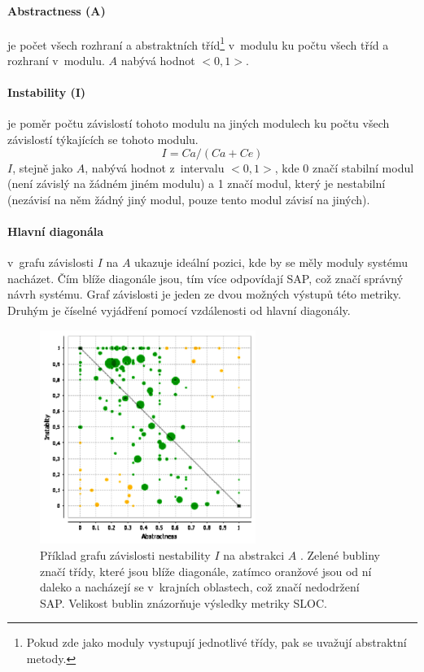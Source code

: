 \documentclass[11pt,twoside,a4paper]{book}
\begin{document}
\paragraph{Abstractness (A)} je počet všech rozhraní a abstraktních tříd\footnote{Pokud zde jako moduly vystupují jednotlivé třídy, pak
se uvažují abstraktní metody.}
v~modulu ku počtu všech tříd a rozhraní v~modulu. $A$ nabývá hodnot $<0,1>$.

\paragraph{Instability (I)} je poměr počtu závislostí tohoto modulu na jiných modulech ku počtu všech závislostí týkajících se tohoto modulu.
$$I = Ca / (Ca + Ce)$$
$I$, stejně jako $A$, nabývá hodnot z~intervalu $<0,1>$, kde 0 značí stabilní modul (není závislý na žádném jiném modulu) a 1 značí modul,
který je nestabilní (nezávisí na něm žádný jiný modul, pouze tento modul závisí na jiných).

\paragraph{Hlavní diagonála} v~grafu závislosti $I$ na $A$ ukazuje ideální pozici, kde by se měly moduly systému nacházet.
Čím blíže diagonále jsou, tím více odpovídají SAP, což značí správný návrh systému.
Graf závislosti je jeden ze dvou možných výstupů této metriky. Druhým je číselné vyjádření pomocí vzdálenosti od hlavní diagonály.

\begin{figure}[H]
\begin{center}
\includegraphics[width=7cm]{figures/martins_metrics2.pdf}
\caption{Příklad grafu závislosti nestability $I$ na abstrakci $A$ \cite{STAN_paper}. Zelené bubliny značí třídy, které jsou blíže diagonále,
zatímco oranžové jsou od ní daleko a nacházejí se v~krajních oblastech, což značí nedodržení SAP. Velikost bublin znázorňuje výsledky metriky SLOC.}
\label{fig:martins_metrics}
\end{center}
\end{figure}
\end{document}
